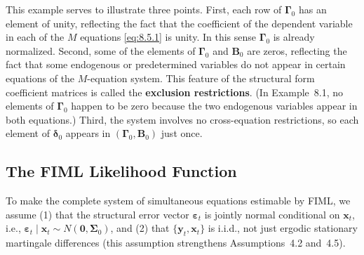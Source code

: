 This example serves to illustrate three points. First, each row of $\boldsymbol{\Gamma}_0$ has an
element of unity, reflecting the fact that the coefficient of the dependent variable
in each of the $M$ equations \eqref{eq:8.5.1} is unity. In this sense $\boldsymbol{\Gamma}_0$ is already normalized. Second, some of the elements of $\boldsymbol{\Gamma}_0$ and $\mathbf{B}_0$ are zeros, reflecting the fact that some
endogenous or predetermined variables do not appear in certain equations of the
$M$-equation system. This feature of the structural form coefficient matrices is
called the \textbf{exclusion restrictions}. (In Example~8.1, no elements of $\boldsymbol{\Gamma}_0$ happen
to be zero because the two endogenous variables appear in both equations.) Third,
the system involves no cross-equation restrictions, so each element of $\boldsymbol{\delta}_0$ appears
in $(\boldsymbol{\Gamma}_0, \mathbf{B}_0)$ just once.

\subsection*{The FIML Likelihood Function}

To make the complete system of simultaneous equations estimable by FIML, we
assume (1) that the structural error vector $\boldsymbol{\varepsilon}_t$ is jointly normal conditional on $\mathbf{x}_t$,
i.e., $\boldsymbol{\varepsilon}_t \mid \mathbf{x}_t \sim N(\mathbf{0}, \boldsymbol{\Sigma}_0)$, and
(2) that $\{\mathbf{y}_t, \mathbf{x}_t\}$ is i.i.d., not just ergodic stationary
martingale differences (this assumption strengthens Assumptions~4.2 and~4.5).

